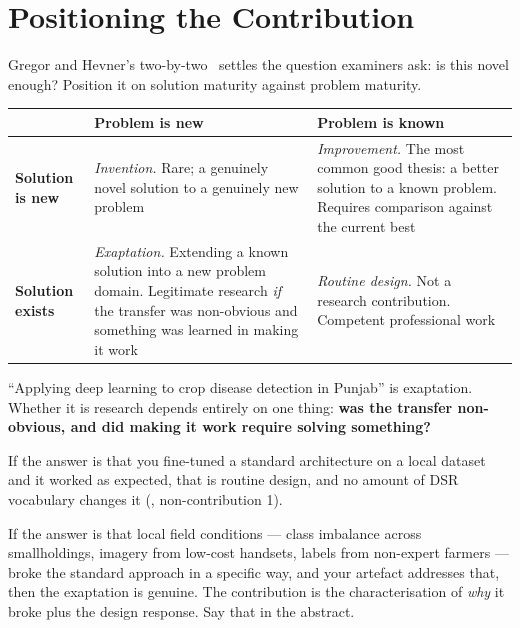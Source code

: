 \section{Positioning the Contribution}

Gregor and Hevner's two-by-two~\cite{gregor2013positioning} settles the question
examiners ask: is this novel enough? Position it on solution maturity against
problem maturity.

\begin{center}
\small
\begin{tabular}{@{}L{2.6cm}L{5.6cm}L{5.6cm}@{}}
\toprule
 & \textbf{Problem is new} & \textbf{Problem is known} \\
\midrule
\textbf{Solution is new}
  & \emph{Invention.} Rare; a genuinely novel solution to a genuinely new
    problem
  & \emph{Improvement.} The most common good thesis: a better solution to a
    known problem. Requires comparison against the current best \\
\textbf{Solution exists}
  & \emph{Exaptation.} Extending a known solution into a new problem domain.
    Legitimate research \emph{if} the transfer was non-obvious and something
    was learned in making it work
  & \emph{Routine design.} Not a research contribution. Competent professional
    work \\
\bottomrule
\end{tabular}
\end{center}

\begin{alertbox}
``Applying deep learning to crop disease detection in Punjab'' is exaptation.
Whether it is research depends entirely on one thing: \textbf{was the transfer
non-obvious, and did making it work require solving something?}

\medskip
If the answer is that you fine-tuned a standard architecture on a local
dataset and it worked as expected, that is routine design, and no amount of
DSR vocabulary changes it (, non-contribution 1).

\medskip
If the answer is that local field conditions --- class imbalance across
smallholdings, imagery from low-cost handsets, labels from non-expert farmers
--- broke the standard approach in a specific way, and your artefact addresses
that, then the exaptation is genuine. The contribution is the characterisation
of \emph{why} it broke plus the design response. Say that in the abstract.
\end{alertbox}

